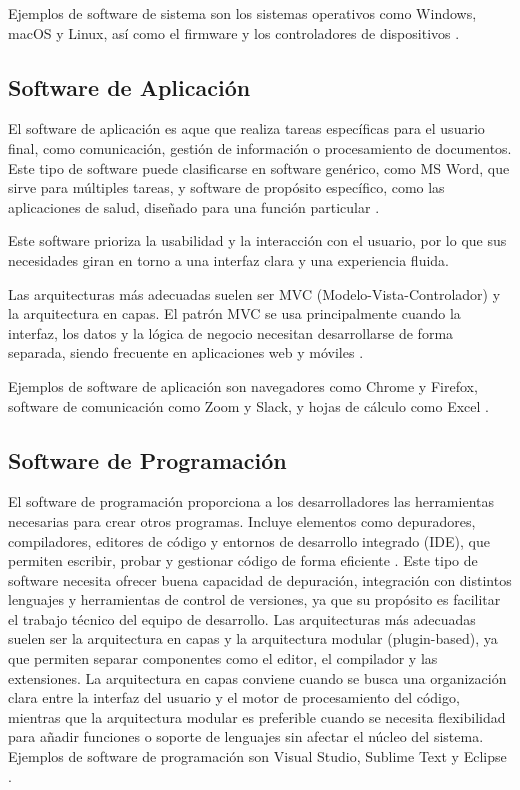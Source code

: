 \documentclass[12pt, letterpaper]{article}
\begin{document}
Ejemplos de software de sistema son los sistemas operativos como Windows, macOS y Linux, así como el firmware y los controladores de dispositivos \parencite{finoit2025software}.

\subsection{Software de Aplicación}
El software de aplicación es aque que realiza tareas específicas para el usuario final, como comunicación, gestión de información o procesamiento de documentos. Este tipo de software puede clasificarse en software genérico, como MS Word, que sirve para múltiples tareas, y software de propósito específico, como las aplicaciones de salud, diseñado para una función particular \parencite{finoit2025software}.

Este software prioriza la usabilidad y la interacción con el usuario, por lo que sus necesidades giran en torno a una interfaz clara y una experiencia fluida.

Las arquitecturas más adecuadas suelen ser MVC (Modelo-Vista-Controlador) y la arquitectura en capas. El patrón MVC se usa principalmente cuando la interfaz, los datos y la lógica de negocio necesitan desarrollarse de forma separada, siendo frecuente en aplicaciones web y móviles \parencite{dharmadasa2025architecture}.

Ejemplos de software de aplicación son navegadores como Chrome y Firefox, software de comunicación como Zoom y Slack, y hojas de cálculo como Excel \parencite{finoit2025software}.

\subsection{Software de Programación}
El software de programación proporciona a los desarrolladores las herramientas necesarias para crear otros programas. Incluye elementos como depuradores, compiladores, editores de código y entornos de desarrollo integrado (IDE), que permiten escribir, probar y gestionar código de forma eficiente \parencite{finoit2025software}.
Este tipo de software necesita ofrecer buena capacidad de depuración, integración con distintos lenguajes y herramientas de control de versiones, ya que su propósito es facilitar el trabajo técnico del equipo de desarrollo.
Las arquitecturas más adecuadas suelen ser la arquitectura en capas y la arquitectura modular (plugin-based), ya que permiten separar componentes como el editor, el compilador y las extensiones. La arquitectura en capas conviene cuando se busca una organización clara entre la interfaz del usuario y el motor de procesamiento del código, mientras que la arquitectura modular es preferible cuando se necesita flexibilidad para añadir funciones o soporte de lenguajes sin afectar el núcleo del sistema.
Ejemplos de software de programación son Visual Studio, Sublime Text y Eclipse \parencite{finoit2025software}.
\end{document}
